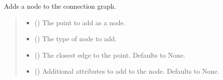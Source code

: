 \documentclass[letterpaper,10pt,english]{sphinxmanual}
\begin{document}
\begin{fulllineitems}
\begin{fulllineitems}
\begin{quote}
\begin{description}
\end{description}\end{quote}

\end{fulllineitems}


\begin{fulllineitems}
\label{\detokenize{pysewer:pysewer.preprocessing.ModelDomain.add_node}}
\pysigstartsignatures
{}
\pysigstopsignatures
\sphinxAtStartPar
Adds a node to the connection graph.
\begin{quote}\begin{description}
\begin{itemize}
\item {} 
\sphinxAtStartPar
{} () \textendash{} The point to add as a node.

\item {} 
\sphinxAtStartPar
{} () \textendash{} The type of node to add.

\item {} 
\sphinxAtStartPar
{} (\sphinxstyleliteralemphasis{\sphinxupquote{, }}) \textendash{} The closest edge to the point. Defaults to None.

\item {} 
\sphinxAtStartPar
{} (\sphinxstyleliteralemphasis{\sphinxupquote{, }}) \textendash{} Additional attributes to add to the node. Defaults to None.

\end{itemize}


\end{description}
\end{quote}
\end{fulllineitems}
\end{fulllineitems}
\end{document}
